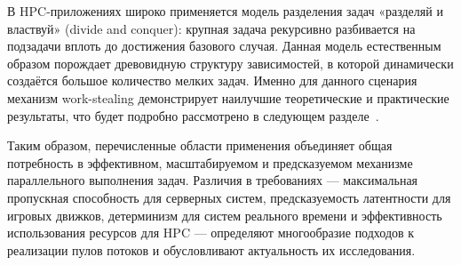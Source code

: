 В HPC-приложениях широко применяется модель разделения задач «разделяй и властвуй» (divide and conquer): крупная задача рекурсивно разбивается на подзадачи вплоть до достижения базового случая. Данная модель естественным образом порождает древовидную структуру зависимостей, в которой динамически создаётся большое количество мелких задач. Именно для данного сценария механизм work-stealing демонстрирует наилучшие теоретические и практические результаты, что будет подробно рассмотрено в следующем разделе~\cite{Blumofe1999}.

Таким образом, перечисленные области применения объединяет общая потребность в эффективном, масштабируемом и предсказуемом механизме параллельного выполнения задач. Различия в требованиях --- максимальная пропускная способность для серверных систем, предсказуемость латентности для игровых движков, детерминизм для систем реального времени и эффективность использования ресурсов для HPC --- определяют многообразие подходов к реализации пулов потоков и обусловливают актуальность их исследования.